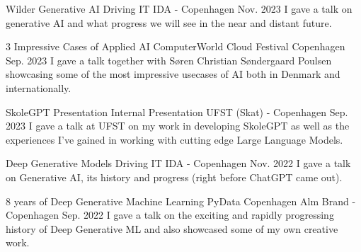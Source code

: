 \begin{cventries}
    \cventry
    {Wilder Generative AI} %
    {Driving IT} %
    {IDA - Copenhagen} %
    {Nov. 2023} %
    {
      I gave a talk on generative AI and what progress we will see in the near and distant future.
    }

    \cventry
    {3 Impressive Cases of Applied AI} %
    {ComputerWorld Cloud Festival} %
    {Copenhagen} %
    {Sep. 2023} %
    {
      I gave a talk together with Søren Christian Søndergaard Poulsen showcasing some of the most impressive usecases of AI both in Denmark and internationally.
    }

    \cventry
    {SkoleGPT Presentation} %
    {Internal Presentation} %
    {UFST (Skat) - Copenhagen} %
    {Sep. 2023} %
    {
      I gave a talk at UFST on my work in developing SkoleGPT as well as the experiences I've gained in working with cutting edge Large Language Models.
    }

    \cventry
    {Deep Generative Models} %
    {Driving IT} %
    {IDA - Copenhagen} %
    {Nov. 2022} %
    {
      I gave a talk on Generative AI, its history and progress (right before ChatGPT came out).
    }

    \cventry
    {8 years of Deep Generative Machine Learning} %
    {PyData Copenhagen} %
    {Alm Brand - Copenhagen} %
    {Sep. 2022} %
    {
      I gave a talk on the exciting and rapidly progressing history of Deep Generative ML and also showcased some of my own creative work.
    }


\end{cventries}